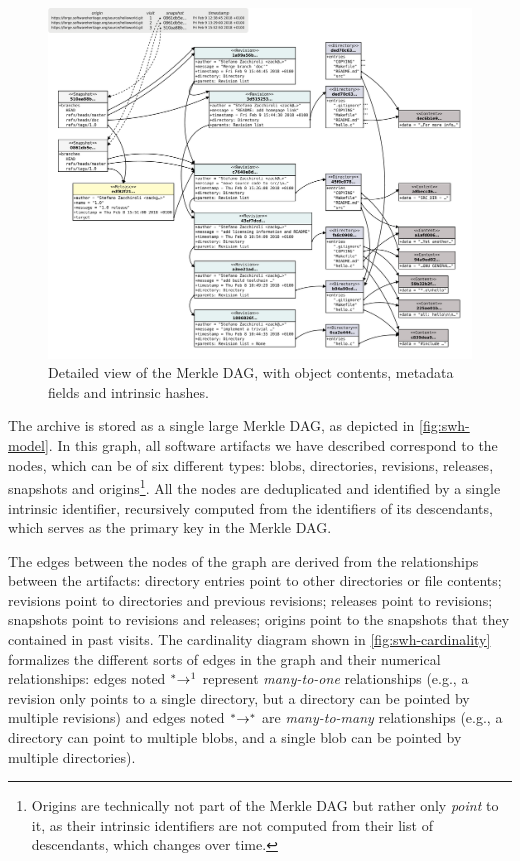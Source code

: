 \begin{figure}
    \centering
    \includegraphics[width=\textwidth]{img/swh-merkle-dag}
    \caption{Detailed view of the Merkle \gls{DAG}, with object contents,
    metadata fields and intrinsic hashes.}%
\end{figure}

The archive is stored as a single large Merkle \gls{DAG}, as depicted
in \cref{fig:swh-model}. In this graph, all software artifacts we have
described correspond to the nodes, which can be of six different types:
blobs, directories, revisions, releases, snapshots and
origins\footnote{Origins are technically not part of the Merkle DAG but rather
only \emph{point} to it, as their intrinsic identifiers are not computed from
their list of descendants, which changes over time.}.
All the nodes are deduplicated and identified by a single intrinsic
identifier, recursively computed from the identifiers of its descendants, which
serves as the primary key in the Merkle \gls{DAG}.

The edges between the nodes of the graph are derived from the relationships
between the artifacts: directory entries point to other directories or file
contents; revisions point to directories and previous revisions; releases point
to revisions; snapshots point to revisions and releases; origins point to the
snapshots that they contained in past visits.
The cardinality diagram shown in \cref{fig:swh-cardinality} formalizes the
different sorts of edges in the graph and their numerical relationships: edges
noted $\prescript{\ast}{}\rightarrow^1$ represent \emph{many-to-one}
relationships (e.g., a revision only points to a single directory, but a
directory can be pointed by multiple revisions) and edges noted
$\prescript{\ast}{}\rightarrow^\ast$ are \emph{many-to-many} relationships
(e.g., a directory can point to multiple blobs, and a single blob can be
pointed by multiple directories).

